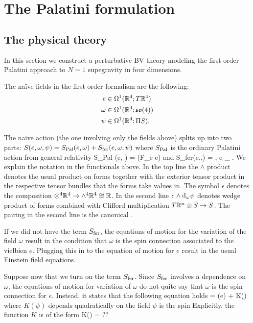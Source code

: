 \section{The Palatini formulation}
 
\subsection{The physical theory}
In this section we construct a perturbative BV theory modeling the first-order Palatini approach to $N=1$ supegravity in four dimensions. 

The na\"{i}ve fields in the first-order formalism are the following: 
\begin{align*}
e & \in \Omega^1(\mathbb R^4 ; T \mathbb R^4) \\
\omega & \in \Omega^1(\mathbb R^4 ; \mathfrak s \mathfrak o(4)) \\
\psi & \in \Omega^1(\mathbb R^4 ; \Pi S) .
\end{align*} 

The na\"{i}ve action (the one involving only the fields above) splits up into two parts: $S (e, \omega, \psi) = S_{\rm Pal}(e, \omega) + S_{\rm fer}(e, \omega, \psi)$ where $S_{\rm Pal}$ is the ordinary Palatini action from general relativity
\ben
S_{\rm Pal} (e, \omega) = \int \epsilon(F_\omega \wedge e \wedge e)
\een
and
\ben
S_{\rm fer}(e,\omega,\psi) = \int \<\psi, e \cdot \d_\omega \psi\> .
\een
We explain the notation in the functionals above. 
In the top line the $\wedge$ product denotes the usual product on forms together with the exterior tensor product in the respective tensor bundles that the forms take values in. 
The symbol $\epsilon$ denotes the composition $\otimes^4 \mathbb R^4 \to \wedge^4 \mathbb R^4 \cong \mathbb R$. 
In the second line $e \wedge {\rm d}_\omega \psi$ denotes wedge product of forms combined with Clifford multiplication $T \mathbb R^n \otimes S \to S$. 
The pairing in the second line is the canonical . 

If we did not have the term $S_{\rm fer}$, the equations of motion for the variation of the field $\omega$ result in the condition that $\omega$ is the spin connection associated to the vielbien $e$. 
Plugging this in to the equation of motion for $e$ result in the usual Einstein field equations. 

Suppose now that we turn on the term $S_{\rm fer}$. 
Since $S_{\rm fer}$ involves a dependence on $\omega$, the equations of motion for variation of $\omega$ do not quite say that $\omega$ is the spin connection for $e$. 
Instead, it states that the following equation holds
\ben
\omega = \omega(e) + K(\psi)
\een
where $K(\psi)$ depends quadratically on the field $\psi$ is the spin 
Explicitly, the function $K$ is of the form
\ben
K(\psi) = ?? 
\een 
{}

